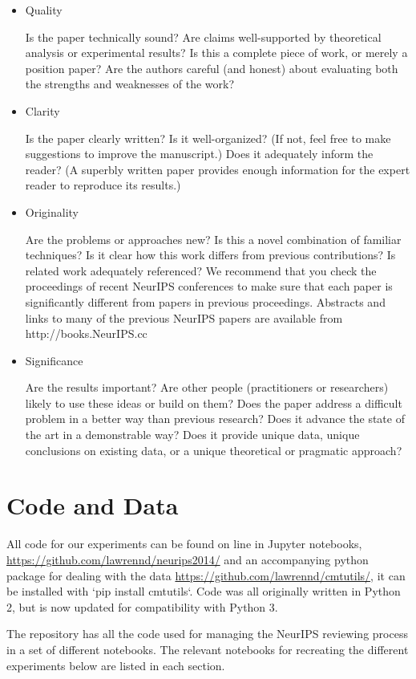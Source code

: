 \begin{itemize}
\item
  Quality

  Is the paper technically sound? Are claims well-supported by
  theoretical analysis or experimental results? Is this a complete piece
  of work, or merely a position paper? Are the authors careful (and
  honest) about evaluating both the strengths and weaknesses of the
  work?
\item
  Clarity

  Is the paper clearly written? Is it well-organized? (If not, feel free
  to make suggestions to improve the manuscript.) Does it adequately
  inform the reader? (A superbly written paper provides enough
  information for the expert reader to reproduce its results.)
\item
  Originality

  Are the problems or approaches new? Is this a novel combination of
  familiar techniques? Is it clear how this work differs from previous
  contributions? Is related work adequately referenced? We recommend
  that you check the proceedings of recent NeurIPS conferences to make sure
  that each paper is significantly different from papers in previous
  proceedings. Abstracts and links to many of the previous NeurIPS papers
  are available from http://books.NeurIPS.cc
\item
  Significance
  
  Are the results important? Are other people (practitioners or
  researchers) likely to use these ideas or build on them? Does the paper
  address a difficult problem in a better way than previous research? Does
  it advance the state of the art in a demonstrable way? Does it provide
  unique data, unique conclusions on existing data, or a unique
  theoretical or pragmatic approach?
\end{itemize}

\section{Code and Data}

All code for our experiments can be found on line in Jupyter notebooks, \url{https://github.com/lawrennd/neurips2014/} and an accompanying python package for dealing with the data \url{https://github.com/lawrennd/cmtutils/}, it can be installed with `pip install cmtutils`. Code was all originally written in Python 2, but is now updated for compatibility with Python 3.

The repository has all the code used for managing the NeurIPS reviewing process in a set of different notebooks. The relevant notebooks for recreating the different experiments below are listed in each section.

